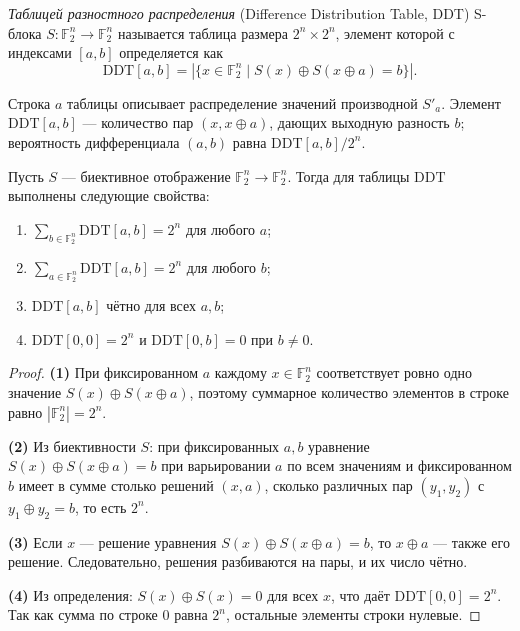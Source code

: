 \begin{definition}
\emph{Таблицей разностного распределения} (Difference Distribution Table, DDT)
S-блока $S: \mathbb{F}_2^n \to \mathbb{F}_2^n$ называется таблица размера
$2^n \times 2^n$, элемент которой с индексами $[a, b]$ определяется как
\[
    \mathrm{DDT}[a, b] = |\{x \in \mathbb{F}_2^n \mid S(x) \oplus S(x \oplus a) = b\}|.
\]
\end{definition}

Строка $a$ таблицы описывает распределение значений производной $S'_a$.
Элемент $\mathrm{DDT}[a, b]$ — количество пар $(x, x \oplus a)$, дающих
выходную разность $b$; вероятность дифференциала $(a, b)$ равна
$\mathrm{DDT}[a, b] / 2^n$.

\begin{theorem}
\label{thm:ddt-properties}
Пусть $S$ — биективное отображение $\mathbb{F}_2^n \to \mathbb{F}_2^n$. Тогда
для таблицы $\mathrm{DDT}$ выполнены следующие свойства:
\begin{enumerate}
    \item $\displaystyle\sum_{b \in \mathbb{F}_2^n} \mathrm{DDT}[a, b] = 2^n$ для любого $a$;
    \item $\displaystyle\sum_{a \in \mathbb{F}_2^n} \mathrm{DDT}[a, b] = 2^n$ для любого $b$;
    \item $\mathrm{DDT}[a, b]$ чётно для всех $a, b$;
    \item $\mathrm{DDT}[0, 0] = 2^n$ и $\mathrm{DDT}[0, b] = 0$ при $b \neq 0$.
\end{enumerate}
\end{theorem}

\begin{proof}
\textbf{(1)} При фиксированном $a$ каждому $x \in \mathbb{F}_2^n$
соответствует ровно одно значение $S(x) \oplus S(x \oplus a)$, поэтому
суммарное количество элементов в строке равно $|\mathbb{F}_2^n| = 2^n$.

\textbf{(2)} Из биективности $S$: при фиксированных $a, b$ уравнение
$S(x) \oplus S(x \oplus a) = b$ при варьировании $a$ по всем значениям и
фиксированном $b$ имеет в сумме столько решений $(x, a)$, сколько различных
пар $(y_1, y_2)$ с $y_1 \oplus y_2 = b$, то есть $2^n$.

\textbf{(3)} Если $x$ — решение уравнения $S(x) \oplus S(x \oplus a) = b$,
то $x \oplus a$ — также его решение. Следовательно, решения разбиваются
на пары, и их число чётно.

\textbf{(4)} Из определения: $S(x) \oplus S(x) = 0$ для всех $x$, что
даёт $\mathrm{DDT}[0, 0] = 2^n$. Так как сумма по строке $0$ равна $2^n$,
остальные элементы строки нулевые.
\end{proof}

